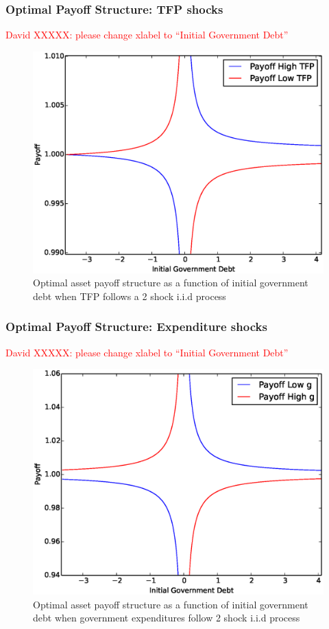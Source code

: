 \documentclass{beamer}
\begin{document}
  \begin{frame}
   \frametitle{Optimal Payoff Structure: TFP shocks}
   \textcolor{red}{David XXXXX: please change xlabel to ``Initial Government Debt''}
	\begin{figure}
		\begin{center}
		\includegraphics[scale=.4]{Images/p_graph_tfp.eps}
		\caption{Optimal asset payoff structure as a function of initial government debt when TFP follows a 2 shock i.i.d process}
	\end{center}	
	\end{figure}

  \end{frame}

%
  \begin{frame}
   \frametitle{Optimal Payoff Structure: Expenditure shocks}
   \textcolor{red}{David XXXXX: please change xlabel to ``Initial Government Debt''}
	\begin{figure}
		\begin{center}
		\includegraphics[scale=.4]{Images/p_graph.eps}
		\caption{Optimal asset payoff structure as a function of initial government debt when government expenditures follow 2 shock i.i.d process}
	\end{center}	
	\end{figure}

  \end{frame}
%
%
\end{document}
